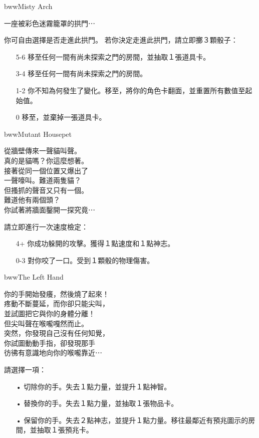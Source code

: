 \linebreak[0]%
\begin{EventCard}{bww}{Misty Arch}
  \begin{CardStory}
    一座被彩色迷霧籠罩的拱門⋯
  \end{CardStory}
  你可自由選擇是否走進此拱門。\smallbreak
  若你決定走進此拱門，請立即擲３顆骰子：
  \begin{itemize}
    \item[5-6] 移至任何一間有尚未探索之門的房間，並抽取１張道具卡。
    \item[3-4] 移至任何一間有尚未探索之門的房間。
    \item[1-2] 你不知為何發生了變化。移至，將你的角色卡翻面，並重置所有數值至起始值。
    \item[0] 移至，並棄掉一張道具卡。
  \end{itemize}
\end{EventCard}%
\linebreak[0]%
\begin{EventCard}{bww}{Mutant Housepet}
  \begin{CardStory}
    從牆壁傳來一聲貓叫聲。\\
    真的是貓嗎？你這麼想著。\\
    接著從同一個位置又爆出了\\
    一聲嚎叫。難道兩隻貓？\\
    但搔抓的聲音又只有一個。\\
    難道他有兩個頭？\\
    你試著將牆面鑿開一探究竟⋯
  \end{CardStory}
  請立即進行一次速度檢定：
  \begin{itemize}
    \item[4+] 你成功躲開\ThisName{}的攻擊。獲得１點速度和１點神志。
    \item[0-3] \ThisName{}對你咬了一口。受到１顆骰的物理傷害。
  \end{itemize}
\end{EventCard}%
\linebreak[0]%
\begin{EventCard}{bww}{The Left Hand}
  \begin{CardStory}
    你的手開始發癢，然後燒了起來！\\
    疼動不斷蔓延，而你卻只能尖叫，\\
    並試圖把它與你的身體分離！\\
    但尖叫聲在喉嚨嘎然而止。\\
    突然，你發現自己沒有任何知覺，\\
    你試圖動動手指，卻發現那手\\
    彷彿有意識地向你的喉嚨靠近⋯
  \end{CardStory}
  請選擇一項：
  \begin{itemize}
    \item[•] 切除你的手。失去１點力量，並提升１點神智。
    \item[•] 替換你的手。失去１點力量，並抽取１張物品卡。
    \item[•] 保留你的手。失去２點神志，並提升１點力量。移往最鄰近有預兆圖示的房間，並抽取１張預兆卡。
  \end{itemize}
\end{EventCard}%
